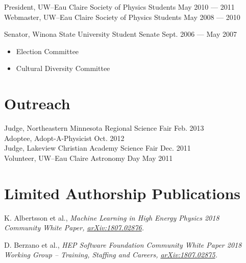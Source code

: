 \documentclass[11pt]{cv}
\begin{document}
\begin{cv}
President, UW--Eau Claire Society of Physics Students \hfill May 2010 --- 2011 \\
Webmaster, UW--Eau Claire Society of Physics Students \hfill May 2008 --- 2010

Senator, Winona State University Student Senate \hfill Sept. 2006 --- May 2007
\begin{itemize}
  \item Election Committee
  \item Cultural Diversity Committee
\end{itemize}


\section{Outreach}
Judge, Northeastern Minnesota Regional Science Fair \hfill Feb. 2013 \\
Adoptee, Adopt-A-Physicist \hfill Oct. 2012 \\
Judge, Lakeview Christian Academy Science Fair \hfill Dec. 2011 \\
Volunteer, UW--Eau Claire Astronomy Day \hfill May 2011


\section{Limited Authorship Publications}
\begin{etaremune}
  \item K. Albertsson et al., \it Machine Learning in High Energy Physics \rm \hfill 2018 \\
  \it Community White Paper, \rm \href{https://arxiv.org/abs/1807.02876}{arXiv:1807.02876}.
  \item D. Berzano et al., \it HEP Software Foundation Community White Paper \rm \hfill 2018 \\
  \it Working Group -- Training, Staffing and Careers, \rm \href{https://arxiv.org/abs/1807.02875}{arXiv:1807.02875}.
\end{etaremune}

\newpage


\end{cv}
\end{document}
